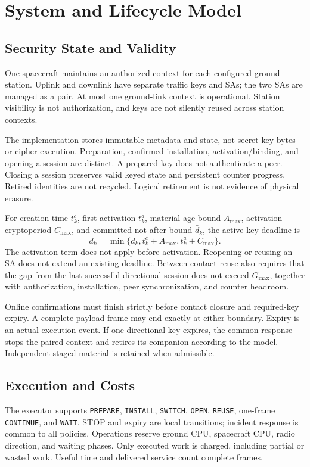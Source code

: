 \documentclass[conference]{IEEEtran}
\newcommand{\op}[1]{\texttt{#1}}
\begin{document}
\section{System and Lifecycle Model}
\subsection{Security State and Validity}
One spacecraft maintains an authorized context for each configured ground station. Uplink and downlink have separate traffic keys and SAs; the two SAs are managed as a pair. At most one ground-link context is operational. Station visibility is not authorization, and keys are not silently reused across station contexts.

The implementation stores immutable metadata and state, not secret key bytes or cipher execution. Preparation, confirmed installation, activation/binding, and opening a session are distinct. A prepared key does not authenticate a peer. Closing a session preserves valid keyed state and persistent counter progress. Retired identities are not recycled. Logical retirement is not evidence of physical erasure.

For creation time $t_k^c$, first activation $t_k^a$, material-age bound $A_{\max}$, activation cryptoperiod $C_{\max}$, and committed not-after bound $\bar d_k$, the active key deadline is
\begin{equation}
d_k=\min\{\bar d_k,t_k^c+A_{\max},t_k^a+C_{\max}\}.
\end{equation}
The activation term does not apply before activation. Reopening or reusing an SA does not extend an existing deadline. Between-contact reuse also requires that the gap from the last successful directional session does not exceed $G_{\max}$, together with authorization, installation, peer synchronization, and counter headroom.

Online confirmations must finish strictly before contact closure and required-key expiry. A complete payload frame may end exactly at either boundary. Expiry is an actual execution event. If one directional key expires, the common response stops the paired context and retires its companion according to the model. Independent staged material is retained when admissible.

\subsection{Execution and Costs}
The executor supports \op{PREPARE}, \op{INSTALL}, \op{SWITCH}, \op{OPEN}, \op{REUSE}, one-frame \op{CONTINUE}, and \op{WAIT}. STOP and expiry are local transitions; incident response is common to all policies. Operations reserve ground CPU, spacecraft CPU, radio direction, and waiting phases. Only executed work is charged, including partial or wasted work. Useful time and delivered service count complete frames.
\end{document}
